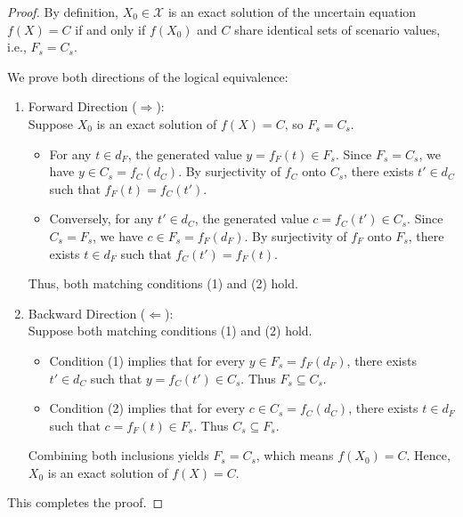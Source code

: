 \documentclass[a4paper,12pt, twoside]{memoir}
\begin{document}
\begin{proof}
	By definition, $X_0 \in \mathcal{X}$ is an exact solution of the uncertain equation $f(X) = C$ if and only if $f(X_0)$ and $C$ share identical sets of scenario values, i.e., $F_s = C_s$.

	We prove both directions of the logical equivalence:

	\begin{enumerate}[leftmargin=*]
		\item Forward Direction ($\Rightarrow$): \\
		      Suppose $X_0$ is an exact solution of $f(X) = C$, so $F_s = C_s$.
		      \begin{itemize}[leftmargin=*]
			      \item For any $t \in d_F$, the generated value $y = f_F(t) \in F_s$. Since $F_s = C_s$, we have $y \in C_s = f_C(d_C)$. By surjectivity of $f_C$ onto $C_s$, there exists $t' \in d_C$ such that $f_F(t) = f_C(t')$.
			      \item Conversely, for any $t' \in d_C$, the generated value $c = f_C(t') \in C_s$. Since $C_s = F_s$, we have $c \in F_s = f_F(d_F)$. By surjectivity of $f_F$ onto $F_s$, there exists $t \in d_F$ such that $f_C(t') = f_F(t)$.
		      \end{itemize}
		      Thus, both matching conditions (1) and (2) hold.

		\item Backward Direction ($\Leftarrow$): \\
		      Suppose both matching conditions (1) and (2) hold.
		      \begin{itemize}[leftmargin=*]
			      \item Condition (1) implies that for every $y \in F_s = f_F(d_F)$, there exists $t' \in d_C$ such that $y = f_C(t') \in C_s$. Thus $F_s \subseteq C_s$.
			      \item Condition (2) implies that for every $c \in C_s = f_C(d_C)$, there exists $t \in d_F$ such that $c = f_F(t) \in F_s$. Thus $C_s \subseteq F_s$.
		      \end{itemize}
		      Combining both inclusions yields $F_s = C_s$, which means $f(X_0) = C$. Hence, $X_0$ is an exact solution of $f(X) = C$.
	\end{enumerate}

	This completes the proof.
\end{proof}

\end{document}
